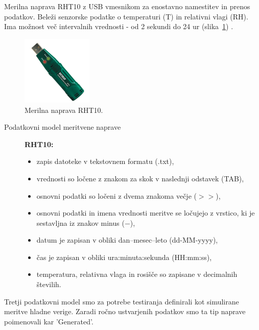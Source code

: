 \documentclass[a4paper, 12pt]{book}
\begin{document}
\clearpage

Merilna naprava RHT10 z USB vmesnikom za enostavno namestitev in prenos podatkov. Beleži senzorske podatke o temperaturi (T) in relativni vlagi (RH). 
Ima možnost več intervalnih vrednosti - od 2 sekundi do 24 ur (slika~\ref{merilna-naprava-rht10}) \cite{rht10-dialogger}.

\begin{figure}[h]
\begin{center}
\includegraphics[width=0.3\textwidth]{slike/merilna-naprava-rht10.png}
\end{center}
\caption{Merilna naprava RHT10.}
\label{merilna-naprava-rht10}
\end{figure}

\begin{description}
\item[Podatkovni model meritvene naprave]\textbf{RHT10:}
\begin{itemize}
\item zapis datoteke v tekstovnem formatu (.txt),
\item vrednosti so ločene z znakom za skok v naslednji odstavek (TAB),
\item osnovni podatki so ločeni z dvema znakoma večje ($>>$),
\item osnovni podatki in imena vrednosti meritve se ločujejo z vrstico, ki je sestavljna iz znakov minus ($-$),
\item datum je zapisan v obliki dan--mesec--leto (dd-MM-yyyy),
\item čas je zapisan v obliki ura:minuta:sekunda (HH:mm:ss),
\item temperatura, relativna vlaga in rosišče so zapisane v decimalnih številih.
\end{itemize}
\end{description}


\clearpage

\noindent Tretji podatkovni model smo za potrebe testiranja definirali kot simulirane meritve hladne verige. Zaradi ročno ustvarjenih podatkov smo ta tip naprave poimenovali kar 'Generated'.
\end{document}
